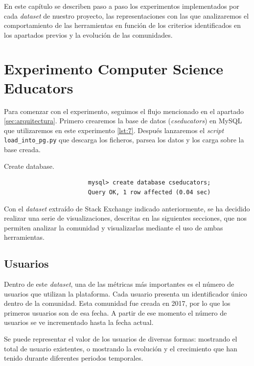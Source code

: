 \documentclass[a4paper, 12pt]{book}
\begin{document}
En este capítulo se describen paso a paso los experimentos implementados por cada \textit{dataset} de nuestro proyecto, las representaciones con las que analizaremos el comportamiento de las herramientas en función de los criterios identificados en los apartados previos y la evolución de las comunidades. 

\section{Experimento Computer Science Educators}
\label{chap:exper_cseducators}

Para comenzar con el experimento, seguimos el flujo mencionado en el apartado \ref{sec:arquitectura}. 
Primero crearemos la base de datos (\emph{cseducators}) en MySQL que utilizaremos en este experimento \ref{lst:7}. Después lanzaremos el \emph{script} \texttt{load\_into\_pg.py} que descarga los ficheros, parsea los datos y los carga sobre la base creada.
\begin{listing}[t]
    \caption{Create database.}{}
    \label{lst:7}
    \begin{verbatim}
                        mysql> create database cseducators;
                        Query OK, 1 row affected (0.04 sec)
    \end{verbatim}
\end{listing}

Con el \textit{dataset} extraído de Stack Exchange indicado anteriormente, se ha decidido realizar una serie de visualizaciones, descritas en las siguientes secciones, que nos permiten analizar la comunidad y visualizarlas mediante el uso de ambas herramientas. 


\subsection{Usuarios}
Dentro de este \textit{dataset}, una de las métricas más importantes es el número de usuarios que utilizan la plataforma. Cada usuario presenta un identificador único dentro de la comunidad.  
Esta comunidad fue creada en 2017, por lo que los primeros usuarios son de esa fecha. A partir de ese momento el número de usuarios se ve incrementado hasta la fecha actual. 

Se puede representar el valor de los usuarios de diversas formas: mostrando el total de usuario existentes, o mostrando la evolución y el crecimiento que han tenido durante diferentes periodos temporales. 
\end{document}
